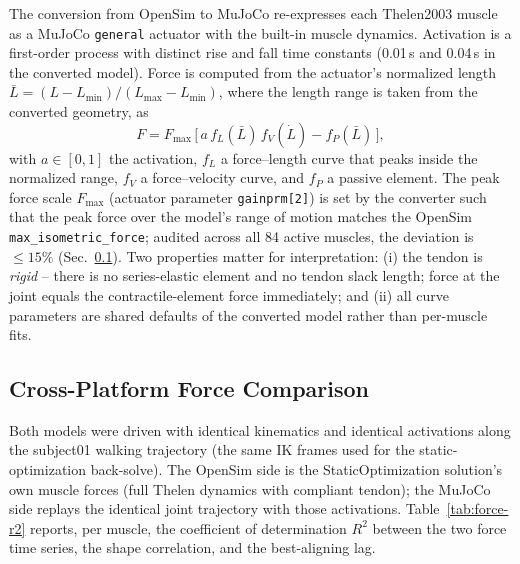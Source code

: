 The conversion from OpenSim to MuJoCo re-expresses each Thelen2003
muscle as a MuJoCo \texttt{general} actuator with the built-in muscle
dynamics. Activation is a first-order process with distinct rise and
fall time constants (0.01\,s and 0.04\,s in the converted model). Force
is computed from the actuator's normalized length
$\bar{L} = (L - L_{\min}) / (L_{\max} - L_{\min})$, where the length
range is taken from the converted geometry, as
\begin{equation}
  F = F_{\max}\,\bigl[\,a\, f_L(\bar{L})\, f_V(\dot{L}) - f_P(\bar{L})\,\bigr],
  \label{eq:mj-muscle}
\end{equation}
with $a \in [0,1]$ the activation, $f_L$ a force--length curve that
peaks inside the normalized range, $f_V$ a force--velocity curve, and
$f_P$ a passive element. The peak force scale $F_{\max}$ (actuator
parameter \texttt{gainprm[2]}) is set by the converter such that the
peak force over the model's range of motion matches the OpenSim
\texttt{max\_isometric\_force}; audited across all 84 active muscles,
the deviation is $\le 15\%$ (Sec.~\ref{sec:muscle-models-compare}). Two
properties matter for interpretation: (i) the tendon is \emph{rigid} --
there is no series-elastic element and no tendon slack length; force at
the joint equals the contractile-element force immediately; and (ii)
all curve parameters are shared defaults of the converted model rather
than per-muscle fits.

\subsection{Cross-Platform Force Comparison}
\label{sec:muscle-models-compare}

Both models were driven with identical kinematics and identical
activations along the subject01 walking trajectory (the same IK frames
used for the static-optimization back-solve). The OpenSim side is the
StaticOptimization solution's own muscle forces (full Thelen dynamics
with compliant tendon); the MuJoCo side replays the identical joint
trajectory with those activations. Table~\ref{tab:force-r2} reports, per
muscle, the coefficient of determination $R^2$ between the two force
time series, the shape correlation, and the best-aligning lag.

